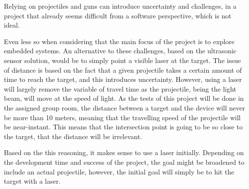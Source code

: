 Relying on projectiles and guns can introduce uncertainty and challenges, in a project that already seems difficult from a software perspective, which is not ideal.

Even less so when considering that the main focus of the project is to explore embedded systems.
An alternative to these challenges, based on the ultrasonic sensor solution, would be to simply point a visible laser at the target.
The issue of distance is based on the fact that a given projectile takes a certain amount of time to reach the target, and this introduces uncertainty. 
However, using a laser will largely remove the variable of travel time as the projectile, being the light beam, will move at the speed of light.
As the tests of this project will be done in the assigned group room, the distance between a target and the device will never be more than 10 meters, meaning that the travelling speed of the projectile will be near-instant. 
This means that the intersection point is going to be so close to the target, that the distance will be irrelevant.


Based on the this reasoning, it makes sense to use a laser initially.
Depending on the development time and success of the project, the goal might be broadened to include an actual projectile, however, the initial goal will simply be to hit the target with a laser.
